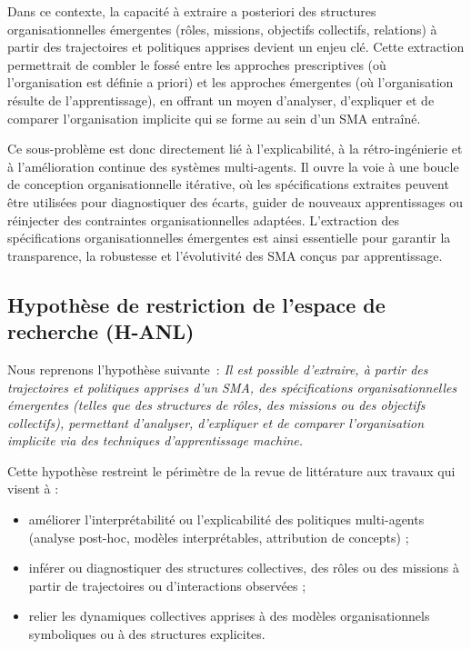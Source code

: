 Dans ce contexte, la capacité à extraire a posteriori des structures organisationnelles émergentes (rôles, missions, objectifs collectifs, relations) à partir des trajectoires et politiques apprises devient un enjeu clé. Cette extraction permettrait de combler le fossé entre les approches prescriptives (où l’organisation est définie a priori) et les approches émergentes (où l’organisation résulte de l’apprentissage), en offrant un moyen d’analyser, d’expliquer et de comparer l’organisation implicite qui se forme au sein d’un SMA entraîné.

Ce sous-problème est donc directement lié à l’explicabilité, à la rétro-ingénierie et à l’amélioration continue des systèmes multi-agents. Il ouvre la voie à une boucle de conception organisationnelle itérative, où les spécifications extraites peuvent être utilisées pour diagnostiquer des écarts, guider de nouveaux apprentissages ou réinjecter des contraintes organisationnelles adaptées. L’extraction des spécifications organisationnelles émergentes est ainsi essentielle pour garantir la transparence, la robustesse et l’évolutivité des SMA conçus par apprentissage.

\subsection*{Hypothèse de restriction de l’espace de recherche (H-ANL)}

Nous reprenons l’hypothèse suivante~: \textit{Il est possible d’extraire, à partir des trajectoires et politiques apprises d’un SMA, des spécifications organisationnelles émergentes (telles que des structures de rôles, des missions ou des objectifs collectifs), permettant d’analyser, d’expliquer et de comparer l’organisation implicite via des techniques d'apprentissage machine.}

Cette hypothèse restreint le périmètre de la revue de littérature aux travaux qui visent à :
\begin{itemize}
  \item améliorer l’interprétabilité ou l’explicabilité des politiques multi-agents (analyse post-hoc, modèles interprétables, attribution de concepts) ;
  \item inférer ou diagnostiquer des structures collectives, des rôles ou des missions à partir de trajectoires ou d’interactions observées ;
  \item relier les dynamiques collectives apprises à des modèles organisationnels symboliques ou à des structures explicites.
\end{itemize}

